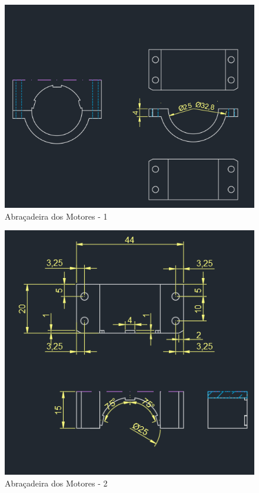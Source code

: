 \begin{figure}[h]
	\centering
	\includegraphics{figures/cad3}
	\caption{Abraçadeira dos Motores - 1}
	\label{fig:abracadeira}
\end{figure}

\begin{figure}[h]
	\centering
	\includegraphics{figures/cad3_2}
	\caption{Abraçadeira dos Motores - 2}
	\label{fig:abracadeira_2}
\end{figure}

